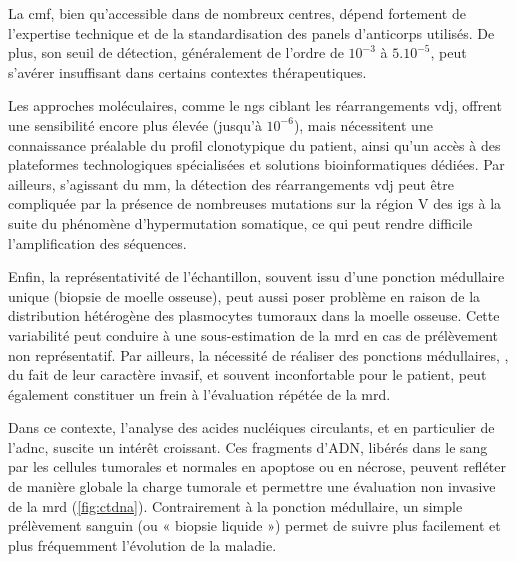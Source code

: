 \vspace{1em}

La \gls{cmf}, bien qu'accessible dans de nombreux centres, dépend fortement de
l'expertise technique et de la standardisation des panels d'anticorps utilisés.
De plus, son seuil de détection, généralement de l'ordre de $10^{-3}$ à
$5.10^{-5}$, peut s'avérer insuffisant dans certains contextes thérapeutiques.

\vspace{1em}

Les approches moléculaires, comme le \gls{ngs} ciblant les réarrangements
\gls{vdj}, offrent une sensibilité encore plus élevée (jusqu'à $10^{-6}$), mais
nécessitent une connaissance préalable du profil clonotypique du patient, ainsi
qu'un accès à des plateformes technologiques spécialisées et solutions
bioinformatiques dédiées. Par ailleurs, s'agissant du \gls{mm}, la détection
des réarrangements \gls{vdj} peut être compliquée par la présence de nombreuses
mutations sur la région V des \glspl{ig} à la suite du phénomène
d'hypermutation somatique, ce qui peut rendre difficile l'amplification des
séquences.

\vspace{1em}

Enfin, la représentativité de l'échantillon, souvent issu d'une ponction
médullaire unique (biopsie de moelle osseuse), peut aussi poser problème en
raison de la distribution hétérogène des plasmocytes tumoraux dans la moelle
osseuse. Cette variabilité peut conduire à une sous-estimation de la \gls{mrd}
en cas de prélèvement non représentatif. Par ailleurs, la nécessité de réaliser
des ponctions médullaires, , du fait de leur caractère invasif, et souvent
inconfortable pour le patient, peut également constituer un frein à
l'évaluation répétée de la \gls{mrd}.

\vspace{1em}

Dans ce contexte, l'analyse des acides nucléiques circulants, et en particulier
de l'\gls{adnc}, suscite un intérêt croissant. Ces fragments d'ADN, libérés
dans le sang par les cellules tumorales et normales en apoptose ou en nécrose,
peuvent refléter de manière globale la charge tumorale et permettre une
évaluation non invasive de la \gls{mrd} (\autoref{fig:ctdna}). Contrairement à
la ponction médullaire, un simple prélèvement sanguin (ou « biopsie liquide »)
permet de suivre plus facilement et plus fréquemment l'évolution de la maladie.

\vspace{1em}

